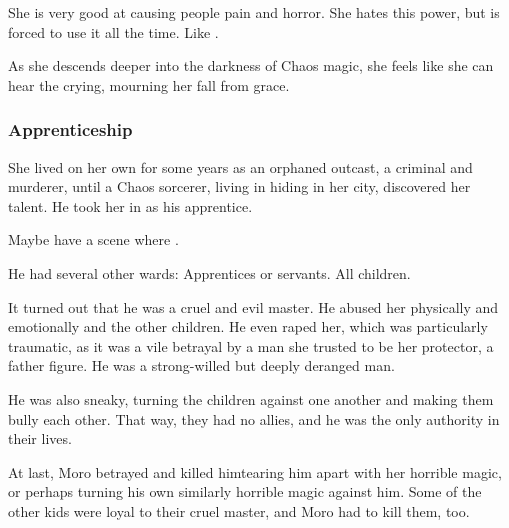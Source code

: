 She is very good at causing people pain and horror. 
She hates this power, but is forced to use it all the time. 
Like \SailorNothing. 

As she descends deeper into the darkness of Chaos magic, she feels like she can hear the \sephiroth{} crying, mourning her fall from grace.






\subsubsection{Apprenticeship}
She lived on her own for some years as an orphaned outcast, a criminal and murderer, until a Chaos sorcerer, living in hiding in her city, discovered her talent. He took her in as his apprentice. 

Maybe have a scene where . 

He had several other wards: 
Apprentices or servants. All children.

It turned out that he was a cruel and evil master. 
He abused her physically and emotionally and the other children. 
He even raped her, which was particularly traumatic, as it was a vile betrayal by a man she trusted to be her protector, a father figure. 
He was a strong-willed but deeply deranged man. 

He was also sneaky, turning the children against one another and making them bully each other. 
That way, they had no allies, and he was the only authority in their lives.

At last, Moro betrayed and killed him\dash tearing him apart with her horrible magic, or perhaps turning his own similarly horrible magic against him. 
Some of the other kids were loyal to their cruel master, and Moro had to kill them, too. 


